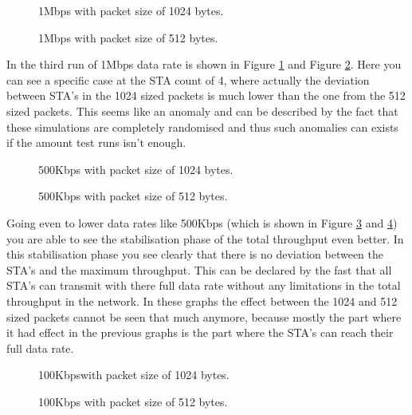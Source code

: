 \documentclass[]{article}
\begin{document}
\begin{figure}[H]
    
   \caption{1Mbps with packet size of 1024 bytes.\label{fig:tp_1}}
\end{figure}
\begin{figure}[H]
    
   \caption{1Mbps with packet size of 512 bytes.\label{fig:tp5_1}}
\end{figure}

\newpage
In the third run of 1Mbps data rate is shown in Figure \ref{fig:tp_1} and Figure \ref{fig:tp5_1}.
Here you can see a specific case at the STA count of 4, where actually the deviation between STA's in the 1024 sized packets is much lower than the one from the 512 sized packets.
This seems like an anomaly and can be described by the fact that these simulations are completely randomised and thus such anomalies can exists if the amount test runs isn't enough.

\begin{figure}[H]
    
   \caption{500Kbps with packet size of 1024 bytes.\label{fig:tp_500}}
\end{figure}
\begin{figure}[H]
    
   \caption{500Kbps with packet size of 512 bytes.\label{fig:tp5_500}}
\end{figure}

\newpage
Going even to lower data rates like 500Kbps (which is shown in Figure \ref{fig:tp_500} and \ref{fig:tp5_500}) you are  able to see the stabilisation phase of the total throughput even better.
In this stabilisation phase you see clearly that there is no deviation between the STA's and the maximum throughput.
This can be declared by the fast that all STA's can transmit with there full data rate without any limitations in the total throughput in the network.
In these graphs the effect between the 1024 and 512 sized packets cannot be seen that much anymore, because mostly the part where it had effect in the previous graphs is the part where the STA's can reach their full data rate.

\begin{figure}[H]
    
   \caption{100Kbpswith packet size of 1024 bytes.\label{fig:tp_100}}
\end{figure}
\begin{figure}[H]
    
   \caption{100Kbps with packet size of 512 bytes.\label{fig:tp5_100}}
\end{figure}
\end{document}
